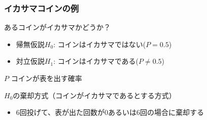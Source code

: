 \documentclass[aspectratio=169]{beamer}
\begin{document}
    \begin{frame}
        \frametitle{イカサマコインの例}
        あるコインがイカサマかどうか？
        \begin{itemize}
            \item 帰無仮説$H_0$: コインはイカサマではない($P = 0.5$)
            \item 対立仮説$H_1$: コインはイカサマである($P \neq 0.5$)
        \end{itemize}
        $P$ コインが表を出す確率
        \vspace{1cm}
        \begin{block}{$H_0$の棄却方式（コインがイカサマであるとする方式）}
            \begin{itemize}
                \item 6回投げて、表が出た回数が0あるいは6回の場合に棄却する
            \end{itemize}
        \end{block}
    \end{frame}
\end{document}
